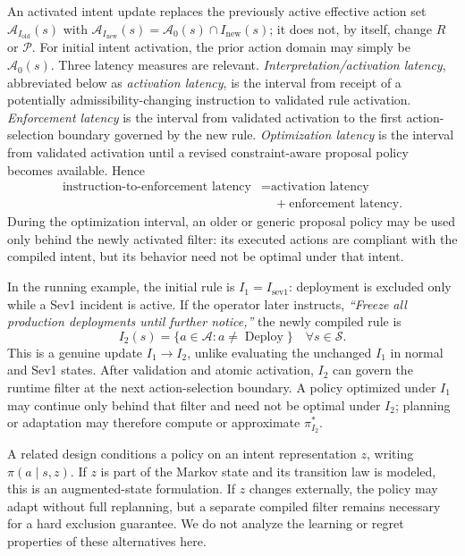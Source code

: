 \documentclass[journal]{IEEEtran}
\theoremstyle{definition}
\newcommand{\cS}{\mathcal{S}}
\newcommand{\cA}{\mathcal{A}}
\newcommand{\cP}{\mathcal{P}}
\begin{document}
An activated intent update replaces the previously active effective action set
$\cA_{I_{\mathrm{old}}}(s)$ with
$\cA_{I_{\mathrm{new}}}(s)=\cA_0(s)\cap I_{\mathrm{new}}(s)$; it does not, by
itself, change $R$ or $\cP$. For initial intent activation, the prior action
domain may simply be $\cA_0(s)$. Three latency measures are relevant.
\emph{Interpretation/activation latency}, abbreviated below as
\emph{activation latency}, is the
interval from receipt of a potentially admissibility-changing instruction to
validated rule activation. \emph{Enforcement latency} is the interval from
validated activation to the first action-selection boundary governed by the
new rule. \emph{Optimization latency} is the interval from validated activation
until a revised constraint-aware proposal policy becomes available. Hence
\begin{equation}
\begin{aligned}
  \text{instruction-to-enforcement latency}
  &= \text{activation latency} \\
  &\quad + \text{enforcement latency}.
\end{aligned}
  \label{eq:latency_decomposition}
\end{equation}
During the optimization interval, an older or generic proposal policy
may be used only behind the newly activated filter: its executed actions are
compliant with the compiled intent, but its behavior need not be optimal under
that intent.

In the running example, the initial rule is
$I_1=I_{\mathrm{sev1}}$: deployment is excluded only while a Sev1 incident
is active. If the operator later instructs, \emph{``Freeze all production
deployments until further notice,''} the newly compiled rule is
\begin{equation}
  I_2(s)=\{a\in\cA:a\neq\operatorname{Deploy}\}
  \quad\forall s\in\cS.
  \label{eq:deployment_freeze}
\end{equation}
This is a genuine update $I_1\rightarrow I_2$, unlike evaluating the
unchanged $I_1$ in normal and Sev1 states. After validation and atomic
activation, $I_2$ can govern the runtime filter at the next action-selection
boundary. A policy optimized under $I_1$ may continue only behind that filter
and need not be optimal under $I_2$; planning or adaptation may therefore
compute or approximate $\pi_{I_2}^*$.

A related design conditions a policy on an intent representation $z$,
writing $\pi(a\mid s,z)$. If $z$ is part of the Markov state and its transition
law is modeled, this is an augmented-state formulation. If $z$ changes
externally, the policy may adapt without full replanning, but a separate
compiled filter remains necessary for a hard exclusion guarantee. We do not
analyze the learning or regret properties of these alternatives here.
\end{document}

